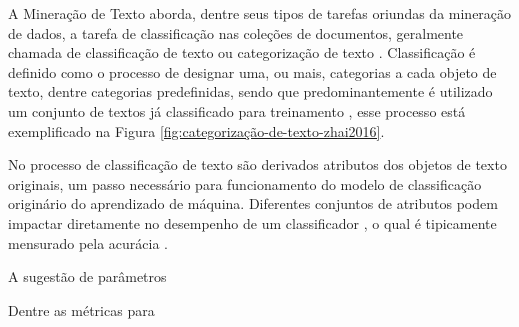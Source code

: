     
    
    A Mineração de Texto aborda, dentre seus tipos de tarefas oriundas da mineração de dados, a tarefa de classificação nas coleções de documentos, geralmente chamada de classificação de texto ou categorização de texto \cite[p.~35]{Zhai2016TDMA}.
    Classificação é definido como o processo de designar uma, ou mais, categorias a cada objeto de texto, dentre categorias predefinidas, sendo que predominantemente é utilizado um conjunto de textos já classificado para treinamento \cite[p.~7]{Jo2018TMCIBDC} \cite[p.~299]{Zhai2016TDMA}, esse processo está exemplificado na Figura \ref{fig:categorização-de-texto-zhai2016}.
    
    No processo de classificação de texto são derivados atributos dos objetos de texto originais, um passo necessário para funcionamento do modelo de classificação originário do aprendizado de máquina.
    Diferentes conjuntos de atributos podem impactar diretamente no desempenho de um classificador \cite[p.~304--306]{Zhai2016TDMA}, o qual é tipicamente mensurado pela acurácia\footnotemark{} \cite[p.~313--314]{Zhai2016TDMA} \cite[p.~9]{Jo2018TMCIBDC}.
    
    
    A sugestão de parâmetros
    
    Dentre as métricas para 
    
